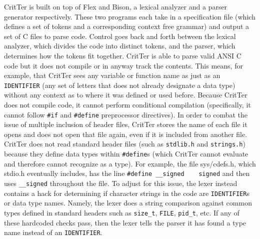 \documentclass[12pt]{report}
\newcommand{\programName}{CritTer\xspace}
\begin{document}
\programName is built on top of Flex and Bison, a lexical analyzer and a  parser generator respectively. 
These two programs each take in a specification file (which defines a set of tokens and a corresponding 
context free grammar) and output a set of C files to parse code. Control goes back and forth between the 
lexical analyzer, which divides the code into distinct tokens, and the parser, which determines how the 
tokens fit together. \programName is able to parse valid ANSI C code but it does not compile or in 
anyway track the contents. This means, for example, that \programName sees any variable or function 
name as just as an \lstinline{IDENTIFIER} (any set of letters that does not already designate a data type) 
without any context as to where it was defined or used before. Because \programName does not compile 
code, it cannot perform conditional compilation (specifically, it cannot follow \lstinline{#if} and 
\lstinline{#define} preprocessor directives). In order to combat the issue of multiple inclusion of header 
files, \programName stores the name of each file it opens and does not open that file again, even if it is 
included from another file. \programName does not read standard header files (such as \lstinline{stdlib.h} 
and \lstinline{strings.h}) because they define data types within \lstinline{#define}s (which \programName 
cannot evaluate and therefore cannot recognize as a type). For example, the file sys/cdefs.h, which 
stdio.h eventually includes, has the line \lstinline{#define __signed    signed} and then uses 
\lstinline{__signed} throughout the file. To adjust for this issue, the lexer instead contains a hack for 
determining if character strings in the code are \lstinline{IDENTIFIER}s or data type names. Namely, the 
lexer does a string comparison against common types defined in standard headers such as 
\lstinline{size_t}, \lstinline{FILE}, \lstinline{pid_t}, etc. If any of these hardcoded checks pass, then the 
lexer tells the parser it has found a type name instead of an \lstinline{IDENTIFIER}.
\end{document}

